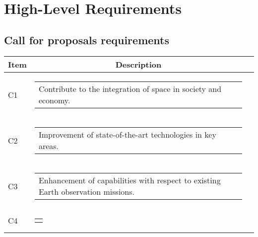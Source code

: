 \section{High-Level Requirements}

\subsection{Call for proposals requirements}
\begin{longtable}[H]{l c c}
	\toprule[2pt]
	\textbf{Item} &  \textbf{Description}                                                                                                                                               \\ \midrule
	C1 & \begin{tabular}[c]{@{}l@{}}\begin{minipage}[t]{\linewidth}
Contribute to the integration of space in society and economy. \vspace{0.3cm}
	\end{minipage} \end{tabular}                                                                                                                                            \\ \hline
	C2 & \begin{tabular}[c]{@{}l@{}}\begin{minipage}[t]{\linewidth}
			Improvement of state-of-the-art technologies in key areas. \vspace{0.3cm}
	\end{minipage} \end{tabular}                                                                                                                                            \\  \midrule
	C3 & \begin{tabular}[c]{@{}l@{}}\begin{minipage}[t]{\linewidth}
Enhancement of capabilities with respect to existing Earth observation missions. \vspace{0.3cm}
	\end{minipage} \end{tabular}                                                                                                                                          \\  \midrule
	C4 & \begin{tabular}[c]{@{}l@{}}\begin{minipage}[t]{\linewidth}

\end{minipage}
\end{tabular}
\end{longtable}
